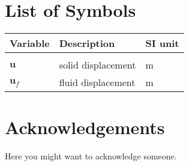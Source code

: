 \documentclass{Configuration_Files/PoliMi3i_thesis}
\begin{document}
\listoffigures

\listoftables

\chapter*{List of Symbols} %
\begin{table}[H]
    \centering
    \begin{tabular}{lll}
        \textbf{Variable} & \textbf{Description} & \textbf{SI unit} \\
		\midrule \\[-9px]
        $\bm{u}$ & solid displacement & m \\[2px]
        $\bm{u}_f$ & fluid displacement & m \\[2px]
    \end{tabular}
\end{table}

\chapter*{Acknowledgements}
Here you might want to acknowledge someone.

\cleardoublepage
\end{document}
